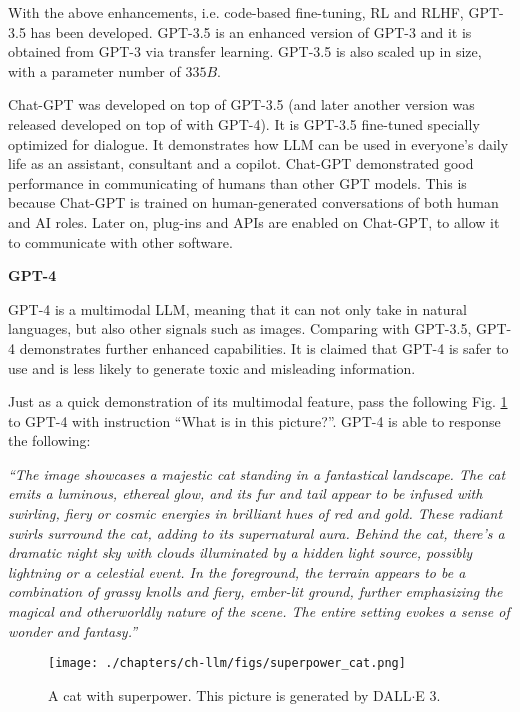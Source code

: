 With the above enhancements, i.e. code-based fine-tuning, RL and RLHF, GPT-3.5 has been developed. GPT-3.5 is an enhanced version of GPT-3 and it is obtained from GPT-3 via transfer learning. GPT-3.5 is also scaled up in size, with a parameter number of $335B$.

Chat-GPT was developed on top of GPT-3.5 (and later another version was released developed on top of with GPT-4). It is GPT-3.5 fine-tuned specially optimized for dialogue. It demonstrates how LLM can be used in everyone's daily life as an assistant, consultant and a copilot. Chat-GPT demonstrated good performance in communicating of humans than other GPT models. This is because Chat-GPT is trained on human-generated conversations of both human and AI roles. Later on, plug-ins and APIs are enabled on Chat-GPT, to allow it to communicate with other software.

\vspace{0.1in}
\noindent \textbf{GPT-4}
\vspace{0.1in}

GPT-4 is a multimodal LLM, meaning that it can not only take in natural languages, but also other signals such as images. Comparing with GPT-3.5, GPT-4 demonstrates further enhanced capabilities. It is claimed that GPT-4 is safer to use and is less likely to generate toxic and misleading information.

Just as a quick demonstration of its multimodal feature, pass the following Fig. \ref{fig:superpower_cat} to GPT-4 with instruction ``What is in this picture?''. GPT-4 is able to response the following:

\vspace{0.1in}
\noindent \textit{``The image showcases a majestic cat standing in a fantastical landscape. The cat emits a luminous, ethereal glow, and its fur and tail appear to be infused with swirling, fiery or cosmic energies in brilliant hues of red and gold. These radiant swirls surround the cat, adding to its supernatural aura. Behind the cat, there's a dramatic night sky with clouds illuminated by a hidden light source, possibly lightning or a celestial event. In the foreground, the terrain appears to be a combination of grassy knolls and fiery, ember-lit ground, further emphasizing the magical and otherworldly nature of the scene. The entire setting evokes a sense of wonder and fantasy.''}
\vspace{0.1in}

\begin{figure}[tbp]
	\centering
	\texttt{[image: ./chapters/ch-llm/figs/superpower\_cat.png]}
	\caption{A cat with superpower. This picture is generated by DALL$\cdot$E 3.}
	\label{fig:superpower_cat}
\end{figure}

